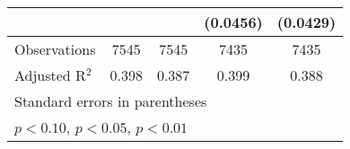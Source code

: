 \documentclass{article}
\begin{document}
\begin{landscape}
\begin{table}[htbp]
\begin{tabular}{l*{4}{c}}
                         &                     &                     &    (0.0456)         &    (0.0429)         \\
\midrule
Observations             &        7545         &        7545         &        7435         &        7435         \\
Adjusted R$^2$           &       0.398         &       0.387         &       0.399         &       0.388         \\
\bottomrule
\multicolumn{5}{l}{\footnotesize Standard errors in parentheses}\\
\multicolumn{5}{l}{\footnotesize \sym{*} \(p<0.10\), \sym{**} \(p<0.05\), \sym{***} \(p<0.01\)}\\
\end{tabular}
\end{table}
\end{landscape}
\end{document}
